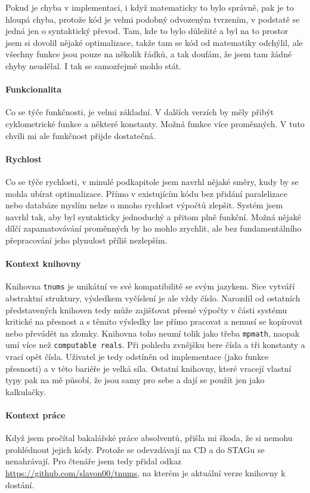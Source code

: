 Pokud je chyba v implementaci, i když matematicky to bylo správně, pak je to hloupá chyba, protože kód je velmi podobný odvozeným tvrzením, v podstatě se jedná jen o syntaktický převod. Tam, kde to bylo důležité a byl na to prostor jsem si dovolil nějaké optimalizace, takže tam se kód od matematiky odchýlil, ale všechny funkce jsou pouze na několik řádků, a tak doufám, že jsem tam žádné chyby neudělal. I tak se samozřejmě mohlo stát.

\paragraph{Funkcionalita} Co se týče funkčnosti, je velmi základní. V dalších verzích by měly přibýt cyklometrické funkce a některé konstanty. Možná funkce více proměnných. V tuto chvíli mi ale funkčnost přijde dostatečná.

\paragraph{Rychlost} Co se týče rychlosti, v minulé podkapitole jsem navrhl nějaké směry, kudy by se mohla ubírat optimalizace. Přímo v existujícím kódu bez přidání paralelizace nebo databáze myslím nelze o mnoho rychlost výpočtů zlepšit. Systém jsem navrhl tak, aby byl syntakticky jednoduchý a přitom plně funkční. Možná nějaké dílčí zapamatovávání proměnných by ho mohlo zrychlit, ale bez fundamentálního přepracování jeho plynulost příliš nezlepším.

\paragraph{Kontext knihovny} Knihovna \texttt{tnums} je unikátní ve své kompatibilitě se svým jazykem. Sice vytváří abstraktní struktury, výsledkem vyčíslení je ale vždy číslo. Narozdíl od ostatních představených knihoven tedy může zajišťovat přesné výpočty v části systému kritické na přesnost a s těmito výsledky lze přímo pracovat a nemusí se kopírovat nebo převádět na zlomky. Knihovna toho neumí tolik jako třeba \texttt{mpmath}, naopak umí více než \texttt{computable reals}. Při pohledu zvnějšku bere čísla a tři konstanty a vrací opět čísla. Uživatel je tedy odstíněn od implementace (jako funkce přesnosti) a v této bariéře je velká síla. Ostatní knihovny, které vracejí vlastní typy pak na mě působí, že jsou samy pro sebe a dají se použít jen jako kalkulačky.

\paragraph{Kontext práce} Když jsem pročítal bakalářské práce absolventů, přišla mi škoda, že si nemohu prohlédnout jejich kódy. Protože se odevzdávají na CD a do STAGu se nenahrávají. Pro čtenáře jsem tedy přidal odkaz \url{https://github.com/slavon00/tnums}, na kterém je aktuální verze knihovny k dostání.

